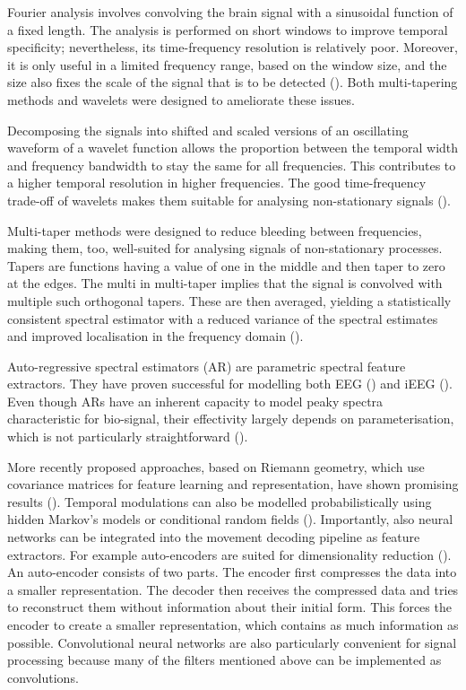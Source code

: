 Fourier analysis involves convolving the brain signal with a sinusoidal function of a fixed length. The analysis is performed on short windows to improve temporal specificity; nevertheless, its time-frequency resolution is relatively poor.
Moreover, it is only useful in a limited frequency range, based on the window size, and the size also fixes the scale of the signal that is to be detected (\cite{36-vugt-2007}). 
Both multi-tapering methods and wavelets were designed to ameliorate these issues. 

Decomposing the signals into shifted and scaled versions of an oscillating waveform of a wavelet function allows the proportion between the temporal width and frequency bandwidth to stay the same for all frequencies. 
This contributes to a higher temporal resolution in higher frequencies. The good time-frequency trade-off of wavelets makes them suitable for analysing non-stationary signals (\cite{36-vugt-2007}).  

Multi-taper methods were designed to reduce bleeding between frequencies, making them, too, well-suited for analysing signals of non-stationary processes. 
Tapers are functions having a value of one in the middle and then taper to zero at the edges. 
The multi in multi-taper implies that the signal is convolved with multiple such orthogonal tapers.
These are then averaged, yielding a statistically consistent spectral estimator with a reduced variance of the spectral estimates and improved localisation in the frequency domain (\cite{multitaper-31}).

Auto-regressive spectral estimators (AR) are parametric spectral feature extractors.
They have proven successful for modelling both EEG (\cite{auto-regressive-eeg}) and iEEG (\cite{anderson-offline-2009}).
Even though ARs have an inherent capacity to model peaky spectra characteristic for bio-signal, their effectivity largely depends on parameterisation, which is not particularly straightforward (\cite{anderson-offline-2009}). 

More recently proposed approaches, based on Riemann geometry, which use covariance matrices for feature learning and representation, have shown promising results (\cite{coherence-based}).
Temporal modulations can also be modelled probabilistically using hidden Markov's models or conditional random fields (\cite{markov-models-decoding, bayesian-decoding}).
Importantly, also neural networks can be integrated into the movement decoding pipeline as feature extractors.
For example auto-encoders are suited for dimensionality reduction (\cite{autoencoder}).
An auto-encoder consists of two parts.
The encoder first compresses the data into a smaller representation.
The decoder then receives the compressed data and tries to reconstruct them without information about their initial form.
This forces the encoder to create a smaller representation, which contains as much information as possible.
Convolutional neural networks are also particularly convenient for signal processing because many of the filters mentioned above can be implemented as convolutions. 


